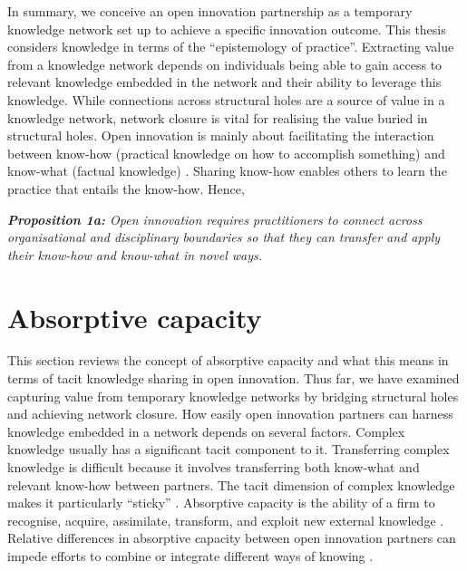 In summary, we conceive an open innovation partnership as a temporary knowledge network set up to achieve a specific innovation outcome. This thesis considers knowledge in terms of the \enquote{epistemology of practice}. Extracting value from a knowledge network depends on individuals being able to gain access to relevant knowledge embedded in the network and their ability to leverage this knowledge. While connections across structural holes are a source of value in a knowledge network, network closure is vital for realising the value buried in structural holes. Open innovation is mainly about facilitating the interaction between know-how (practical knowledge on how to accomplish something) and know-what (factual knowledge) \citep{winter1987knowledge,garud1997distinction}. Sharing know-how enables others to learn the practice that entails the know-how. Hence, \bigskip

\begin{tcolorbox}
\textit{\textbf{Proposition 1a:} Open innovation requires practitioners to connect across organisational and disciplinary boundaries so that they can transfer and apply their know-how and know-what in novel ways.}
\end{tcolorbox}

\section{Absorptive capacity} \label{sec:absorptive}

This section reviews the concept of absorptive capacity and what this means in terms of tacit knowledge sharing in open innovation. Thus far, we have examined capturing value from temporary knowledge networks by bridging structural holes and achieving network closure. How easily open innovation partners can harness knowledge embedded in a network depends on several factors. Complex knowledge usually has a significant tacit component to it. Transferring complex knowledge is difficult because it involves transferring both know-what and relevant know-how between partners. The tacit dimension of complex knowledge makes it particularly \enquote{sticky} \citep{von1994sticky,szulanski2003sticky}. Absorptive capacity is the ability of a firm to recognise, acquire, assimilate, transform, and exploit new external knowledge \citep{cohen1990absorptive}. Relative differences in absorptive capacity between open innovation partners can impede efforts to combine or integrate different ways of knowing \citep{vanhaverbeke2007connecting,lichtenthaler2016absorptive}. \medskip

